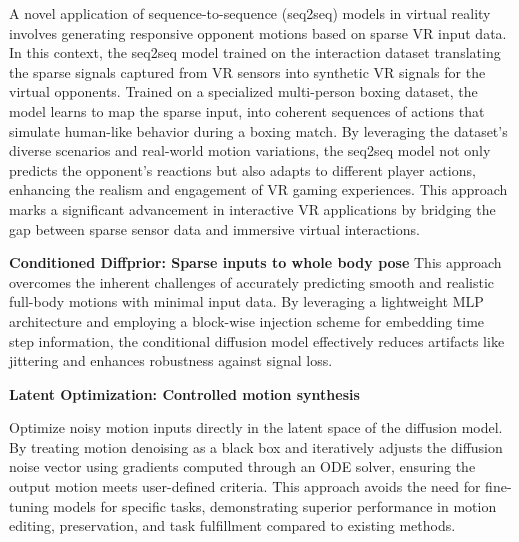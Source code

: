 \documentclass{egpubl}
\begin{document}
A novel application of sequence-to-sequence (seq2seq) models in virtual reality involves generating responsive opponent motions based on sparse VR input data. In this context, the seq2seq model trained on the interaction dataset translating the sparse signals captured from VR sensors into synthetic VR signals for the virtual opponents. Trained on a specialized multi-person boxing dataset, the model learns to map the sparse input, into coherent sequences of actions that simulate human-like behavior during a boxing match. By leveraging the dataset’s diverse scenarios and real-world motion variations, the seq2seq model not only predicts the opponent’s reactions but also adapts to different player actions, enhancing the realism and engagement of VR gaming experiences. This approach marks a significant advancement in interactive VR applications by bridging the gap between sparse sensor data and immersive virtual interactions.

\textbf{Conditioned Diffprior: Sparse inputs to whole body pose}
This approach overcomes the inherent challenges of accurately predicting smooth and realistic full-body motions with minimal input data. By leveraging a lightweight MLP architecture and employing a block-wise injection scheme for embedding time step information, the conditional diffusion model effectively reduces artifacts like jittering and enhances robustness against signal loss.

\textbf{Latent Optimization: Controlled motion synthesis}

Optimize noisy motion inputs directly in the latent space of the diffusion model. By treating motion denoising as a black box and iteratively adjusts the diffusion noise vector using gradients computed through an ODE solver, ensuring the output motion meets user-defined criteria. This approach avoids the need for fine-tuning models for specific tasks, demonstrating superior performance in motion editing, preservation, and task fulfillment compared to existing methods.
\end{document}
